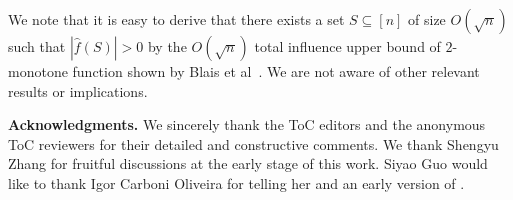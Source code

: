 \documentclass{toc}
\begin{document}
We note that it is easy to derive that there exists a set $S\subseteq[n]$ of size $O(\sqrt{n})$ such that $|\hat{f}(S)|>0$ by the $O(\sqrt{n})$ total influence upper bound of $2$-monotone function shown by Blais et al~\cite{BCOST15}.  We are not aware of other relevant results or implications.  %


\vspace{4ex}
\noindent\textbf{Acknowledgments.} We sincerely thank the
ToC editors and the   %
anonymous ToC reviewers 
%
for their detailed and constructive comments. We thank Shengyu Zhang for fruitful discussions at the early stage of this work. Siyao Guo would like to thank Igor Carboni Oliveira for telling her  and an early version of . 


%
%


%
%
%

\end{document}
